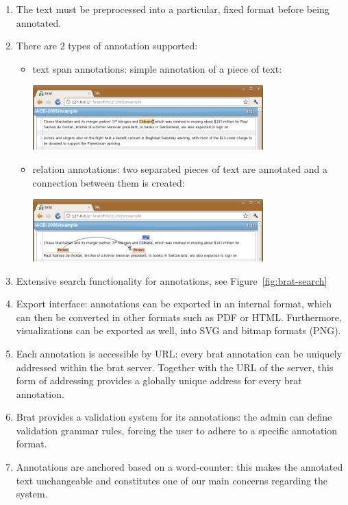 \begin{enumerate}
\item The text must be preprocessed into a particular, fixed format before being
  annotated.
\item There are 2 types of annotation supported:
  \begin{itemize}
  \item text span annotations: simple annotation of a piece of text:
   \begin{center}
     \includegraphics[width=3.5in]{figures/brat-text-span}
   \end{center}
   
  \item relation annotations: two separated pieces of text are annotated and a connection between them is created:
    \begin{center}\includegraphics[width=3.5in]{figures/brat-relation}\end{center}
  \end{itemize}
\item Extensive search functionality for annotations, see Figure~\ref{fig:brat-search}
\item Export interface: annotations can be exported in an internal format, which can then
  be converted in other formats such as PDF or HTML. Furthermore, visualizations can be
  exported as well, into SVG and bitmap formats (PNG).
\item Each annotation is accessible by URL: every brat annotation can be uniquely
  addressed within the brat server. Together with the URL of the server, this form of
  addressing provides a globally unique address for every brat annotation.
\item Brat provides a validation system for its annotations: the admin can define
  validation grammar rules, forcing the user to adhere to a specific annotation format.
\item Annotations are anchored based on a word-counter: this makes the annotated text
  unchangeable and constitutes one of our main concerns regarding the system.
\end{enumerate}
